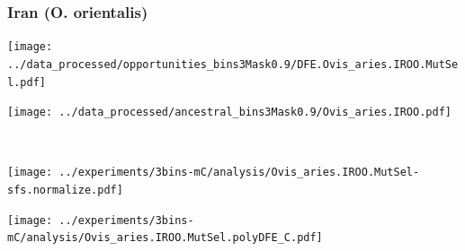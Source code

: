 \subsubsection{Iran (O. orientalis)}

\begin{minipage}{0.49\linewidth}
    \texttt{[image: ../data\_processed/opportunities\_bins3Mask0.9/DFE.Ovis\_aries.IROO.MutSel.pdf]}
\end{minipage}
\begin{minipage}{0.49\linewidth}
    \texttt{[image: ../data\_processed/ancestral\_bins3Mask0.9/Ovis\_aries.IROO.pdf]}
\end{minipage}
\\
\begin{minipage}{0.49\linewidth}
    \texttt{[image: ../experiments/3bins-mC/analysis/Ovis\_aries.IROO.MutSel-sfs.normalize.pdf]}
\end{minipage}
\begin{minipage}{0.4\linewidth}
    \texttt{[image: ../experiments/3bins-mC/analysis/Ovis\_aries.IROO.MutSel.polyDFE\_C.pdf]}
\end{minipage}
